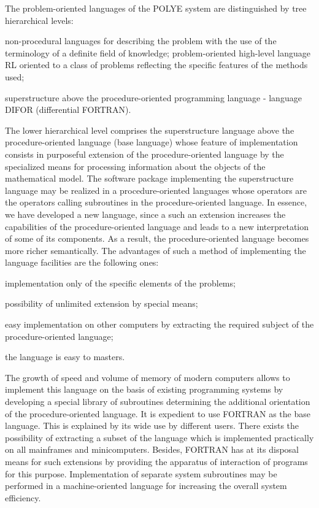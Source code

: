 The problem-oriented languages of the POLYE system are distinguished by tree
hierarchical levels:

non-procedural languages for describing the problem with the use of the
terminology of a definite field of knowledge; problem-oriented high-level
language RL oriented to a class of problems reflecting the specific features
of the methods used;

superstructure above the procedure-oriented programming language - language
DIFOR (differential FORTRAN).

The lower hierarchical level comprises the superstructure language above the
procedure-oriented language (base language) whose feature of implementation
consists in purposeful extension of the procedure-oriented language by the
specialized means for processing information about the objects of the
mathematical model. The software package implementing the superstructure
language may be realized in a procedure-oriented languages whose operators
are the operators calling subroutines in the procedure-oriented language. In
essence, we have developed a new language, since a such an extension
increases the capabilities of the procedure-oriented language and leads to a
new interpretation of some of its components. As a result, the
procedure-oriented language becomes more richer semantically. The advantages
of such a method of implementing the language facilities are the following
ones:

implementation only of the specific elements of the problems;

possibility of unlimited extension by special means;

easy implementation on other computers by extracting the required subject of
the procedure-oriented language;

the language is easy to masters.

The growth of speed and volume of memory of modern computers allows to
implement this language on the basis of existing programming systems by
developing a special library of subroutines determining the additional
orientation of the procedure-oriented language. It is expedient to use
FORTRAN as the base language. This is explained by its wide use by different
users. There exists the possibility of extracting a subset of the language
which is implemented practically on all mainframes and minicomputers.
Besides, FORTRAN has at its disposal means for such extensions by providing
the apparatus of interaction of programs for this purpose. Implementation of
separate system subroutines may be performed in a machine-oriented language
for increasing the overall system efficiency.

